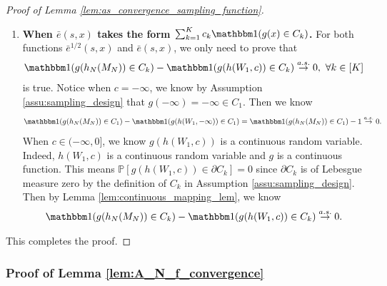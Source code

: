 \documentclass[12pt]{article}
\def\P{\mathbb{P}}
\def\P{\mathbb{P}}
\renewcommand{\P}{\mathbb{P}}							%
\newcommand{\indicator}{\mathbbm 1}						%
\begin{document}
\begin{proof}[Proof of Lemma \ref{lem:as_convergence_sampling_function}]
\begin{enumerate}
		\item \textbf{When $\bar e(s,x)$ takes the form $\sum_{k=1}^K c_k \indicator(g(x)\in C_k)$.}
		For both functions $\bar e^{1/2}(s,x)$ and $\bar e(s,x)$, we only need to prove that 
		\begin{align*}
			\indicator(g(h_N(M_N))\in C_k)-\indicator(g(h(W_1,c))\in C_k)\overset{a.s.}{\rightarrow}0,\ \forall k\in[K]
		\end{align*}
		is true. Notice when $c=-\infty$, we know by Assumption \ref{assu:sampling_design} that $g(-\infty)=-\infty\in C_1$. Then we know  
		\begin{align*}
			\indicator(g(h_N(M_N))\in C_1)-\indicator(g(h(W_1,-\infty))\in C_1)=\indicator(g(h_N(M_N))\in C_1)-1\overset{a.s.}{\rightarrow}0.
		\end{align*}
		When $c\in (-\infty,0]$, we know $g(h(W_1,c))$ is a continuous random variable. Indeed, $h(W_1,c)$ is a continuous random variable and $g$ is a continuous function. This means $\P[g(h(W_1,c))\in \partial C_k]=0$ since $\partial C_k$ is of Lebesgue measure zero by the definition of $C_k$ in Assumption \ref{assu:sampling_design}. Then by Lemma \ref{lem:continuous_mapping_lem}, we know 
		\begin{align*}
			\indicator(g(h_N(M_N))\in C_k)-\indicator(g(h(W_1,c))\in C_k)\overset{a.s.}{\rightarrow}0.
		\end{align*}
	\end{enumerate}

	
	This completes the proof.
\end{proof}




\subsubsection{Proof of Lemma \ref{lem:A_N_f_convergence}}\label{sec:proof_A_N_f_convergence}
\end{document}
